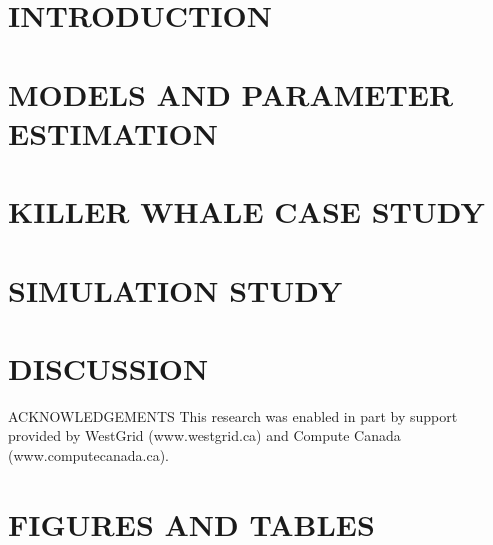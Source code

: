 \documentclass{TD-CJS}
\begin{document}
%
\section{INTRODUCTION}

%
\section{MODELS AND PARAMETER ESTIMATION}
\label{sec:models}

%
\section{KILLER WHALE CASE STUDY}
\label{sec:data}

%
\section{SIMULATION STUDY}
\label{sec:sim_study}

%
\section{DISCUSSION}

%
\begin{ack}{ACKNOWLEDGEMENTS}
This research was enabled in part by support provided by WestGrid (www.westgrid.ca) and Compute Canada (www.computecanada.ca).
\end{ack}
%
\newpage

%
\newpage
\begin{appendix}

\end{appendix}
%
\newpage
\section{FIGURES AND TABLES}

%
\end{document}
